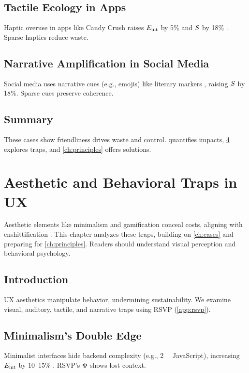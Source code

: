 \section{Tactile Ecology in Apps}
\label{sec:cases-tactile}
Haptic overuse in apps like Candy Crush raises \(E_{\mathrm{int}}\) by 5\% and \(S\) by 18\% \citep{gallace2006}. Sparse haptics reduce waste.

\section{Narrative Amplification in Social Media}
\label{sec:cases-narrative}
Social media uses narrative cues (e.g., emojis) like literary markers \citep{lewis1942}, raising \(S\) by 18\%. Sparse cues preserve coherence.

\section{Summary}
These cases show friendliness drives waste and control.  quantifies impacts, \cref{ch:aesthetic} explores traps, and \cref{ch:principles} offers solutions.

\chapter{Aesthetic and Behavioral Traps in UX}
\label{ch:aesthetic}

Aesthetic elements like minimalism and gamification conceal costs, aligning with enshittification \citep{doctorow2022}. This chapter analyzes these traps, building on \cref{ch:cases} and preparing for \cref{ch:principles}. Readers should understand visual perception and behavioral psychology.

\section{Introduction}
\label{sec:aesthetic-intro}
UX aesthetics manipulate behavior, undermining sustainability. We examine visual, auditory, tactile, and narrative traps using RSVP (\cref{app:rsvp}).

\section{Minimalism’s Double Edge}
\label{sec:aesthetic-minimalism}
Minimalist interfaces hide backend complexity (e.g., \SI{2}{\mega\byte} JavaScript), increasing \(E_{\mathrm{int}}\) by 10--15\% \citep{designlab2024,extentia2024}. RSVP’s \(\Phi\) shows lost context.

